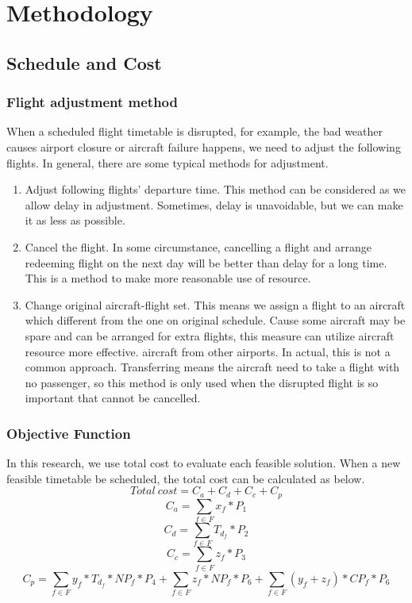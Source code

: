 \documentclass[senior]{IPSstyle}
\begin{document}
\chapter{Methodology} \label{methodology}

\section{Schedule and Cost}

\subsection{Flight adjustment method}
When a scheduled flight timetable is disrupted, for example, the bad weather causes airport closure or aircraft failure happens, we need to adjust the following flights. In general, there are some typical methods for adjustment.
\begin{enumerate}
    \item Adjust following flights’ departure time. This method can be considered as we allow delay in adjustment. Sometimes, delay is unavoidable, but we can make it as less as possible.
    \item Cancel the flight. In some circumstance, cancelling a flight and arrange redeeming flight on the next day will be better than delay for a long time. This is a method to make more reasonable use of resource.
    \item Change original aircraft-flight set. This means we assign a flight to an aircraft which different from the one on original schedule. Cause some aircraft may be spare and can be arranged for extra flights, this measure can utilize aircraft resource more effective.
    \itemTransfer aircraft from other airports. In actual, this is not a common approach. Transferring means the aircraft need to take a flight with no passenger, so this method is only used when the disrupted flight is so important that cannot be cancelled. 
\end{enumerate}

\subsection{Objective Function}
In this research, we use total cost to evaluate each feasible solution. When a new feasible timetable be scheduled, the total cost can be calculated as below.
\begin{equation}
    Total\ cost=C_a+C_d+C_c+C_p
\end{equation}
\begin{equation}
    C_a = \sum_{f\in F} x_{f}*P_1
\end{equation}
\begin{equation}
    C_d =\sum_{f\in F} T_{d_f}*P_2
\end{equation}
\begin{equation}
    C_c=\sum_{f\in F} z_{f}*P_3
\end{equation}
\begin{equation}
    C_p=\sum_{f\in F} y_f*T_{d_f}*NP_f*P_4+\sum_{f\in F} z_f*NP_f*P_6+\sum_{f\in F} (y_f+z_f)*CP_f*P_6
\end{equation}
\end{document}
